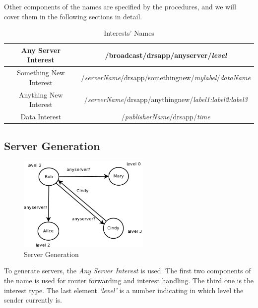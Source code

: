 \documentclass[conference]{IEEEtran}
\begin{document}
Other components of the names are specified by the procedures, and we will cover them in the following sections in detail.
\begin{table}[!t]
\renewcommand{\arraystretch}{1.3}
\caption{Interests' Names}
\label{interest_name}
\centering
\begin{tabular}{|c|c|}
\hline
Any Server Interest & /broadcast/drsapp/anyserver/\emph{level}\\
\hline
Something New Interest & /\emph{serverName}/drsapp/somethingnew/\emph{mylabel}/\emph{dataName}\\
\hline
Anything New Interest & /\emph{serverName}/drsapp/anythingnew/\emph{label1:label2:label3}\\
\hline
Data Interest & /\emph{publisherName}/drsapp/\emph{time}\\
\hline
\end{tabular}
\end{table}

\subsection{Server Generation}
\begin{figure}[!t]
\centering
\includegraphics[width=2.5in]{../png/server-generation.png}
\caption{Server Generation}
\label{server_generation}
\end{figure}
To generate servers, the \emph{Any Server Interest} is used. The first two components of the name is used for router forwarding and interest handling. The third one is the interest type. The last element \emph{`level'} is a number indicating in which level the sender currently is.
\end{document}
